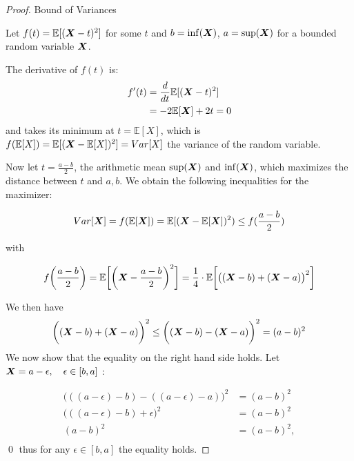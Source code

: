 \begin{proof}{Bound of Variances}

Let $f(t) = \mathbb{E}[(\boldsymbol{X} - t)^2]$ for some $t$ and $b = \inf(\boldsymbol{X})$, $a = \sup(\boldsymbol{X})$ for a bounded random variable $\boldsymbol{X}$.

The derivative of $f(t)$ is:
\begin{equation*}
    \begin{split}
        f'(t) &= \frac{d}{dt} \mathbb{E}[(\boldsymbol{X} - t)^2]\\ 
            &= -2\mathbb{E}[\boldsymbol{X}] + 2t = 0\\
    \end{split}
\end{equation*}
and takes its minimum at $t = \mathbb{E}[X]$, which is $f(\mathbb{E}[X]) = \mathbb{E}[(\boldsymbol{X} - \mathbb{E}[X])^2] = Var[X]$ the variance of the random variable.

Now let  $t=\frac{a-b}{2}$, the arithmetic mean $\sup(\boldsymbol{X})$ and $\inf(\boldsymbol{X})$, which maximizes the distance between $t$ and $a,b$.
We obtain the following inequalities for the maximizer:

\begin{equation*}
    Var[\boldsymbol{X}] = f(\mathbb{E}[\boldsymbol{X}]) = \mathbb{E}[(\boldsymbol{X} - \mathbb{E}[\boldsymbol{X}])^2) \leq f(\frac{a-b}{2})
\end{equation*}

with 

\begin{equation*}
    f\bigg(\frac{a-b}{2}\bigg) = \mathbb{E}\bigg[\bigg(\boldsymbol{X} - \frac{a-b}{2} \bigg)^2\bigg]= \frac{1}{4} \cdot \mathbb{E}\bigg[\big((\boldsymbol{X} - b) + (\boldsymbol{X} - a)  \big)^2\bigg]
\end{equation*}

We then have 
\begin{equation*}
         \bigg((\boldsymbol{X} - b) + (\boldsymbol{X} - a)  \bigg)^2 \leq  \bigg((\boldsymbol{X} - b) - (\boldsymbol{X} - a)  \bigg)^2  = (a-b)^2 
\end{equation*}
We now show that the equality on the right hand side holds.
Let $\boldsymbol{X} = a - \epsilon, \quad \epsilon \in [b,a]$ : 

\begin{equation*}
    \begin{split}
        \bigg(((a-\epsilon) - b) - ((a-\epsilon) - a)  \bigg)^2  &=  (a-b)^2\\
        \bigg(((a-\epsilon) - b) + \epsilon  \bigg)^2 &=  (a-b)^2 \\
        (a-b)^2  &= (a-b)^2,\\
    \end{split}
\end{equation*}
\qed
thus for any $\epsilon \in [b,a]$ the equality holds.


\end{proof}
